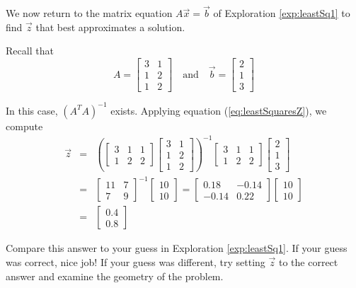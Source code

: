 \documentclass{ximera}
\begin{document}
\begin{example}\label{ex:leastSquares1}
We now return to the matrix equation $A\vec{x}=\vec{b}$ of Exploration \ref{exp:leastSq1} to find $\vec{z}$ that best approximates a solution.

\begin{explanation}
    Recall that $$A=\begin{bmatrix}3 & 1\\1 & 2\\1 & 2\end{bmatrix}\quad\text{and}\quad \vec{b}=\begin{bmatrix}2\\1\\3\end{bmatrix}$$

In this case, $(A^TA)^{-1}$ exists.  Applying equation (\ref{eq:leastSquaresZ}), we compute
\begin{eqnarray*}
\vec{z}&=&\left(\begin{bmatrix}3 & 1 & 1\\1 & 2 & 2\end{bmatrix}\begin{bmatrix}3 & 1\\1 & 2\\1& 2\end{bmatrix}\right)^{-1}\begin{bmatrix}3 & 1 & 1\\1 & 2 & 2\end{bmatrix}\begin{bmatrix}2\\1\\3\end{bmatrix}\\
&=&\begin{bmatrix}11 & 7\\7 & 9\end{bmatrix}^{-1}\begin{bmatrix}10\\10\end{bmatrix}=\begin{bmatrix}0.18 & -0.14\\-0.14 & 0.22\end{bmatrix}\begin{bmatrix}10\\10\end{bmatrix}\\
&=&\begin{bmatrix}0.4\\0.8\end{bmatrix}
    \end{eqnarray*}    
\end{explanation}
Compare this answer to your guess in Exploration \ref{exp:leastSq1}.  If your guess was correct, nice job!  If your guess was different, try setting $\vec{z}$ to the correct answer and examine the geometry of the problem.    
\end{example}
\end{document}

